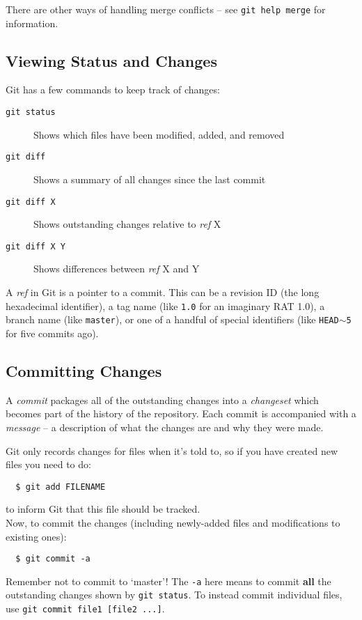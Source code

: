 \documentclass{article}
\begin{document}
There are other ways of handling merge conflicts -- see {\tt git help merge}
for information.

\subsection{Viewing Status and Changes}
\label{sec:status}
Git has a few commands to keep track of changes:

\begin{description}
\item[{\tt git status}] Shows which files have been modified, added, and removed
\item[{\tt git diff}] Shows a summary of all changes since the last commit
\item[{\tt git diff X}] Shows outstanding changes relative to {\it ref} X
\item[{\tt git diff X Y}] Shows differences between {\it ref} X and Y
\end{description}
A {\it ref} in Git is a pointer to a commit. This can be a revision ID (the long
hexadecimal identifier), a tag name (like {\tt 1.0} for an imaginary RAT 1.0),
a branch
name (like {\tt master}), or one of a handful of special identifiers (like
{\tt HEAD$\sim$5} for five commits ago).

\subsection{Committing Changes}
A {\it commit} packages all of the outstanding changes into a {\it changeset}
which becomes part of the history of the repository. Each commit is
accompanied with a {\it message} -- a description of what the changes are and
why they were made.

Git only records changes for files when it's told to, so if you have created
new files you need to do:

\begin{verbatim}
  $ git add FILENAME
\end{verbatim}
to inform Git that this file should be tracked.\\

Now, to commit the changes (including newly-added files and modifications to
existing ones):

\begin{verbatim}
  $ git commit -a
\end{verbatim}
Remember not to commit to `master'! The {\tt -a} here means to commit {\bf all}
the outstanding changes shown by {\tt git status}. To instead commit
individual files, use {\tt git commit file1 [file2 ...]}.\\
\end{document}
